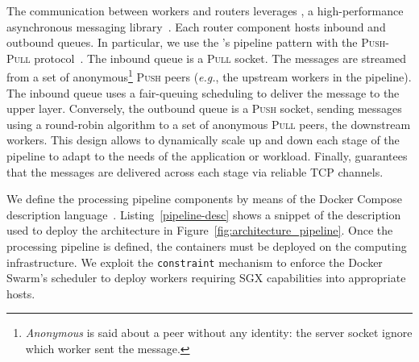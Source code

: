 The communication between workers and routers leverages \zmq, a high-performance asynchronous messaging library~\cite{zero_mq}.
Each router component hosts inbound and outbound queues. %
In particular, we use the \zmq's pipeline pattern with the \textsc{Push}-\textsc{Pull} protocol~\cite{zero_mq:pipeline}.
The inbound queue is a \textsc{Pull} socket.
The messages are streamed from a set of anonymous\footnote{\emph{Anonymous} is said about a peer without any identity: the server socket ignore which worker sent the message.} \textsc{Push} peers (\emph{e.g.}, the upstream workers in the pipeline).
The inbound queue uses a fair-queuing scheduling to deliver the message to the upper layer.
Conversely, the outbound queue is a \textsc{Push} socket, sending messages using a round-robin algorithm to a set of anonymous \textsc{Pull} peers, the downstream workers.
This design allows to dynamically scale up and down each stage of the pipeline to adapt to the needs of the application or workload. %
Finally, \zmq guarantees that the messages are delivered across each stage via reliable TCP channels.

We define the processing pipeline components by means of the Docker Compose description language~\cite{docker:compose}.
Listing~\ref{pipeline-desc} shows a snippet of the description used to deploy the architecture in Figure~\ref{fig:architecture_pipeline}. 
Once the processing pipeline is defined, the containers must be deployed on the computing infrastructure.
We exploit the \texttt{constraint} mechanism to enforce the Docker Swarm's scheduler to deploy workers requiring SGX capabilities into appropriate hosts.

